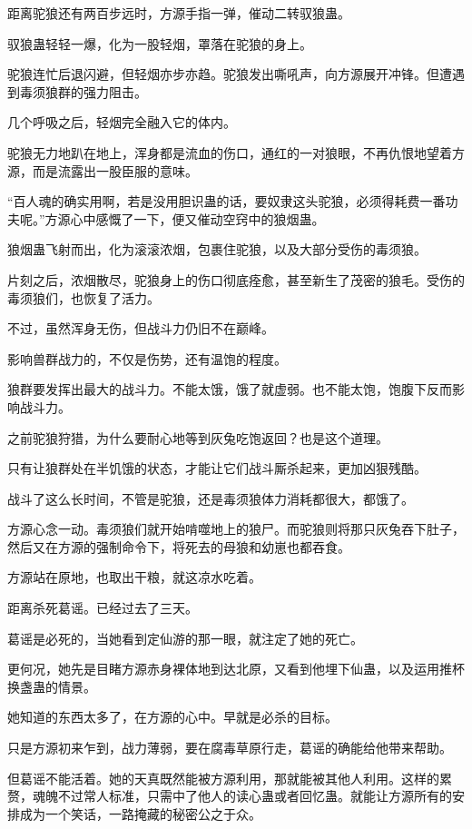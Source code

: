\begin{this_body}
距离驼狼还有两百步远时，方源手指一弹，催动二转驭狼蛊。

驭狼蛊轻轻一爆，化为一股轻烟，罩落在驼狼的身上。

驼狼连忙后退闪避，但轻烟亦步亦趋。驼狼发出嘶吼声，向方源展开冲锋。但遭遇到毒须狼群的强力阻击。

几个呼吸之后，轻烟完全融入它的体内。

驼狼无力地趴在地上，浑身都是流血的伤口，通红的一对狼眼，不再仇恨地望着方源，而是流露出一股臣服的意味。

“百人魂的确实用啊，若是没用胆识蛊的话，要奴隶这头驼狼，必须得耗费一番功夫呢。”方源心中感慨了一下，便又催动空窍中的狼烟蛊。

狼烟蛊飞射而出，化为滚滚浓烟，包裹住驼狼，以及大部分受伤的毒须狼。

片刻之后，浓烟散尽，驼狼身上的伤口彻底痊愈，甚至新生了茂密的狼毛。受伤的毒须狼们，也恢复了活力。

不过，虽然浑身无伤，但战斗力仍旧不在巅峰。

影响兽群战力的，不仅是伤势，还有温饱的程度。

狼群要发挥出最大的战斗力。不能太饿，饿了就虚弱。也不能太饱，饱腹下反而影响战斗力。

之前驼狼狩猎，为什么要耐心地等到灰兔吃饱返回？也是这个道理。

只有让狼群处在半饥饿的状态，才能让它们战斗厮杀起来，更加凶狠残酷。

战斗了这么长时间，不管是驼狼，还是毒须狼体力消耗都很大，都饿了。

方源心念一动。毒须狼们就开始啃噬地上的狼尸。而驼狼则将那只灰兔吞下肚子，然后又在方源的强制命令下，将死去的母狼和幼崽也都吞食。

方源站在原地，也取出干粮，就这凉水吃着。

距离杀死葛谣。已经过去了三天。

葛谣是必死的，当她看到定仙游的那一眼，就注定了她的死亡。

更何况，她先是目睹方源赤身裸体地到达北原，又看到他埋下仙蛊，以及运用推杯换盏蛊的情景。

她知道的东西太多了，在方源的心中。早就是必杀的目标。

只是方源初来乍到，战力薄弱，要在腐毒草原行走，葛谣的确能给他带来帮助。

但葛谣不能活着。她的天真既然能被方源利用，那就能被其他人利用。这样的累赘，魂魄不过常人标准，只需中了他人的读心蛊或者回忆蛊。就能让方源所有的安排成为一个笑话，一路掩藏的秘密公之于众。


\end{this_body}
